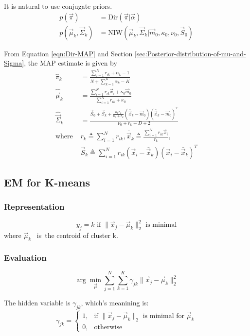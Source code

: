 It is natural to use conjugate priors. 
\begin{align*}
p(\vec{\pi}) & = \mathrm{Dir}(\vec{\pi}|\vec{\alpha}) \\
p(\vec{\mu}_k,\vec{\Sigma}_k) & = \mathrm{NIW}(\vec{\mu}_k,\vec{\Sigma}_k|\vec{m}_0,\kappa_0,\nu_0,\vec{S}_0)
\end{align*}

From Equation \ref{eqn:Dir-MAP} and Section \ref{sec:Posterior-distribution-of-mu-and-Sigma}, the MAP estimate is given by
\begin{align}
\hat{\pi}_k & = \frac{\sum_{i=1}^N r_{ik}+\alpha_k-1}{N+\sum_{k=1}^K \alpha_k-K} \\
\hat{\vec{\mu}}_k & = \frac{\sum_{i=1}^N r_{ik}\vec{x}_i + \kappa_0\vec{m}_0}{\sum_{i=1}^N r_{ik} + \kappa_0} \\
\hat{\vec{\Sigma}}_k & = \frac{\vec{S}_0+\vec{S}_k+\frac{\kappa_0r_k}{\kappa_0+r_k}(\bar{\vec{x}}_k-\vec{m}_0)(\bar{\vec{x}}_k-\vec{m}_0)^T}{\nu_0+r_k+D+2} \\
\text{where } & r_k \triangleq \sum_{i=1}^N r_{ik}, \bar{\vec{x}}_k \triangleq \frac{\sum_{i=1}^N r_{ik}\vec{x}_i}{r_k}, \nonumber \\
  & \vec{S}_k \triangleq \sum_{i=1}^N r_{ik} (\vec{x}_i-\bar{\vec{x}}_k)(\vec{x}_i-\bar{\vec{x}}_k)^T \nonumber
\end{align}


\subsection{EM for K-means}
\label{sec:K-means}

\subsubsection{Representation}
\begin{equation}
y_j=k \text{ if } \|\vec{x}_j-\vec{\mu}_k\|_2^2 \text{ is minimal}
\end{equation}
where $\vec{\mu}_k$ \ is\ the centroid of cluster k.


\subsubsection{Evaluation}
\begin{equation}
\arg\min\limits_{\vec{\mu}} \sum_{j=1}^N {\sum_{k=1}^K}\gamma_{jk}{\|\vec{x}_j-\vec{\mu}_k\|_2^2}
\end{equation}

The hidden variable is $\gamma_{jk}$, which's meanining is:
\begin{equation} \nonumber
\gamma_{jk}=\begin{cases}
1, & \text{if } \|\vec{x}_j-\vec{\mu}_k\|_2 \text{ is minimal for } \vec{\mu}_k \\
0, & \text{otherwise}
\end{cases}
\end{equation}


